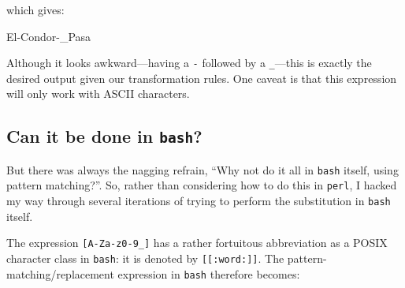 \documentclass[
  a4paper,
]{article}
\newenvironment{Shaded}{\begin{snugshade}}{\end{snugshade}}
\newcommand{\ExtensionTok}[1]{\textcolor[rgb]{0.80,0.80,0.80}{#1}}
\begin{document}
which gives:

\begin{Shaded}
\begin{Highlighting}[]
\ExtensionTok{El{-}Condor{-}\_Pasa}
\end{Highlighting}
\end{Shaded}

Although it looks awkward---having a \texttt{-} followed by a
\texttt{\_}---this is exactly the desired output given our
transformation rules. One caveat is that this expression will only work
with ASCII characters.

\hypertarget{can-it-be-done-in-bash}{%
\subsection{\texorpdfstring{Can it be done in
\texttt{bash}?}{Can it be done in bash?}}\label{can-it-be-done-in-bash}}

But there was always the nagging refrain, ``Why not do it all in
\texttt{bash} itself, using pattern matching?''. So, rather than
considering how to do this in \texttt{perl}, I hacked my way through
several iterations of trying to perform the substitution in
\texttt{bash} itself.

The expression \texttt{{[}A-Za-z0-9\_{]}} has a rather fortuitous
abbreviation as a POSIX character class in \texttt{bash}: it is denoted
by \texttt{{[}{[}:word:{]}{]}}. The pattern-matching/replacement
expression in \texttt{bash} therefore becomes:
\end{document}
